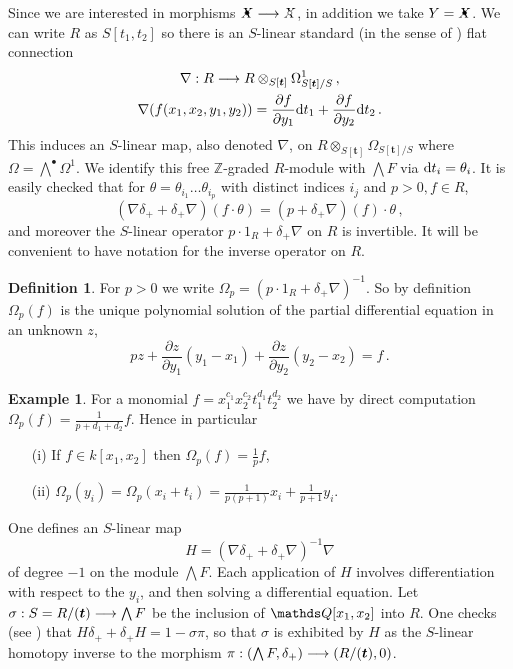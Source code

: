\documentclass{compositio}
\theoremstyle{definition}
\newtheorem{definition}[theorem]{Definition}
\newtheorem{example}[theorem]{Example}
\numberwithin{equation}{section}
\begin{document}
Since we are interested in morphisms $\Xbul \lto \Xcirc$, in addition we take $Y = \Xbul$. We can write $R$ as $S[t_1,t_2]$ so there is an $S$-linear standard (in the sense of \cite[Section 8.1]{dm1102.2957}) flat connection
\begin{gather*}
\nabla: R \longrightarrow R \otimes_{S[\boldsymbol{t}]} \Omega^1_{S[\boldsymbol{t}]/S} \, ,\\
\nabla( f(x_1,x_2,y_1,y_2) ) = \frac{\partial f}{\partial y_1} \mathrm{d} t_1 + \frac{\partial f}{\partial y_2} \mathrm{d} t_2 \, .
\end{gather*}
This induces an $S$-linear map, also denoted $\nabla$, on $R \otimes_{S[\boldsymbol{t}]} \Omega_{S[\boldsymbol{t}]/S}$ where $\Omega = \bigwedge^\bullet \Omega^1$. We identify this free $\mathds{Z}$-graded $R$-module with $\bigwedge F$ via $\mathrm{d} t_i = \theta_i$. It is easily checked that for $\theta = \theta_{i_1} \ldots \theta_{i_p}$ with distinct indices $i_j$ and $p > 0, f \in R$,
\[
(\nabla \delta_+ + \delta_+ \nabla)(f \cdot \theta) = (p + \delta_{+}\nabla)(f) \cdot \theta \, ,
\]
and moreover the $S$-linear operator $p \cdot 1_R + \delta_{+} \nabla$ on $R$ is invertible. It will be convenient to have notation for the inverse operator on $R$.

\begin{definition}\label{defn:omega} For $p > 0$ we write $\Omega_p = (p \cdot 1_R + \delta_{+} \nabla)^{-1}$. So by definition $\Omega_p(f)$ is the unique polynomial solution of the partial differential equation in an unknown $z$,
\[
p z + \frac{\partial z}{\partial y_1} (y_1 - x_1) + \frac{\partial z}{\partial y_2}(y_2 - x_2) = f \, .
\]
\end{definition}

\begin{example}\label{example:compomega} For a monomial $f = x_1^{c_1} x_2^{c_2} t_1^{d_1} t_2^{d_2}$ we have by direct computation $\Omega_p(f) = \frac{1}{p + d_1 + d_2} f$. Hence in particular
\begin{itemize}
\item[(i)] If $f \in k[x_1,x_2]$ then $\Omega_p(f) = \frac{1}{p} f$,
\item[(ii)] $\Omega_p(y_i) = \Omega_p(x_i + t_i) = \frac{1}{p(p+1)} x_i + \frac{1}{p+1} y_i$.
\end{itemize}
\end{example}

One defines an $S$-linear map
\[
H = (\nabla \delta_+ + \delta_+ \nabla)^{-1} \nabla
\]
of degree $-1$ on the module $\bigwedge F$. Each application of $H$ involves differentiation with respect to the $y_i$, and then solving a differential equation. Let $\sigma: S = R/(\boldsymbol{t}) \longrightarrow \bigwedge F$ be the inclusion of $\QQ[x_1,x_2]$ into $R$. One checks (see \cite[Section 8.1]{dm1102.2957}) that $H \delta_+ + \delta_+ H = 1 - \sigma \pi$, so that $\sigma$ is exhibited by $H$ as the $S$-linear homotopy inverse to the morphism $\pi: (\bigwedge F, \delta_+) \longrightarrow (R/(\boldsymbol{t}),0)$.
\end{document}

